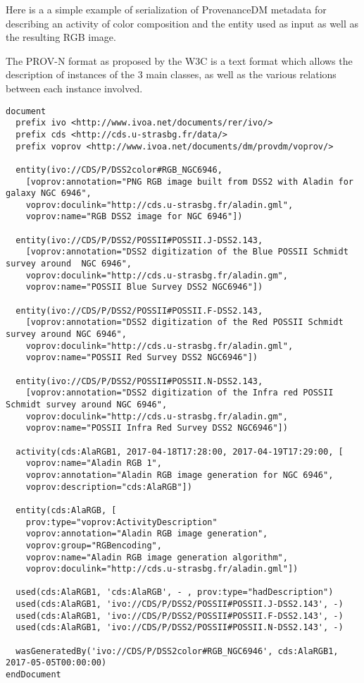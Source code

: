 Here is a a simple example of serialization of ProvenanceDM metadata for describing an activity of color composition and the entity used as input as well as the resulting RGB image. 

The PROV-N format \cite{std:PROV-N} as proposed by the W3C is a text format which allows the description of instances of the 3 main classes, as well as the various relations between each instance involved.

\begin{verbatim}
document
  prefix ivo <http://www.ivoa.net/documents/rer/ivo/>
  prefix cds <http://cds.u-strasbg.fr/data/>
  prefix voprov <http://www.ivoa.net/documents/dm/provdm/voprov/>

  entity(ivo://CDS/P/DSS2color#RGB_NGC6946, 
	[voprov:annotation="PNG RGB image built from DSS2 with Aladin for galaxy NGC 6946", 
	voprov:doculink="http://cds.u-strasbg.fr/aladin.gml", 
	voprov:name="RGB DSS2 image for NGC 6946"])
	
  entity(ivo://CDS/P/DSS2/POSSII#POSSII.J-DSS2.143, 
	[voprov:annotation="DSS2 digitization of the Blue POSSII Schmidt survey around  NGC 6946",
	voprov:doculink="http://cds.u-strasbg.fr/aladin.gm", 
	voprov:name="POSSII Blue Survey DSS2 NGC6946"])
	
  entity(ivo://CDS/P/DSS2/POSSII#POSSII.F-DSS2.143, 
	[voprov:annotation="DSS2 digitization of the Red POSSII Schmidt survey around NGC 6946",
	voprov:doculink="http://cds.u-strasbg.fr/aladin.gml", 
	voprov:name="POSSII Red Survey DSS2 NGC6946"])
	
  entity(ivo://CDS/P/DSS2/POSSII#POSSII.N-DSS2.143, 
	[voprov:annotation="DSS2 digitization of the Infra red POSSII Schmidt survey around NGC 6946",
	voprov:doculink="http://cds.u-strasbg.fr/aladin.gm", 
	voprov:name="POSSII Infra Red Survey DSS2 NGC6946"])
	
  activity(cds:AlaRGB1, 2017-04-18T17:28:00, 2017-04-19T17:29:00, [
	voprov:name="Aladin RGB 1", 
	voprov:annotation="Aladin RGB image generation for NGC 6946",
	voprov:description="cds:AlaRGB"])
	
  entity(cds:AlaRGB, [
	prov:type="voprov:ActivityDescription"
	voprov:annotation="Aladin RGB image generation",
	voprov:group="RGBencoding", 
	voprov:name="Aladin RGB image generation algorithm", 	
	voprov:doculink="http://cds.u-strasbg.fr/aladin.gml"])
	
  used(cds:AlaRGB1, 'cds:AlaRGB', - , prov:type="hadDescription")	
  used(cds:AlaRGB1, 'ivo://CDS/P/DSS2/POSSII#POSSII.J-DSS2.143', -)
  used(cds:AlaRGB1, 'ivo://CDS/P/DSS2/POSSII#POSSII.F-DSS2.143', -)
  used(cds:AlaRGB1, 'ivo://CDS/P/DSS2/POSSII#POSSII.N-DSS2.143', -)
	
  wasGeneratedBy('ivo://CDS/P/DSS2color#RGB_NGC6946', cds:AlaRGB1, 2017-05-05T00:00:00)
endDocument
\end{verbatim}


